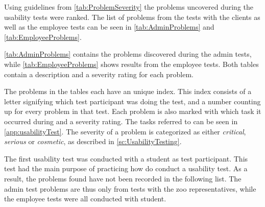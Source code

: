 Using guidelines from \autoref{tab:ProblemSeverity} the problems uncovered during the usability tests were ranked. The list of problems from the tests with the clients as well as the employee tests can be seen in \autoref{tab:AdminProblems} and \autoref{tab:EmployeeProblems}. 
\par
\autoref{tab:AdminProblems} contains the problems discovered during the admin tests, while \autoref{tab:EmployeeProblems} shows results from the employee tests. Both tables contain a description and a severity rating for each problem. 
\par
The problems in the tables each have an unique index. This index consists of a letter signifying which test participant was doing the test, and a number counting up for every problem in that test. Each problem is also marked with which task it occurred during and a severity rating. The tasks referred to can be seen in \autoref{app:usabilityTest}. The severity of a problem is categorized as either \textit{critical}, \textit{serious} or \textit{cosmetic}, as described in \autoref{sc:UsabilityTesting}. 
\par
The first usability test was conducted with a student as test participant. This test had the main purpose of practicing how do conduct a usability test. As a result, the problems found have not been recorded in the following list. The admin test problems are thus only from tests with the zoo representatives, while the employee tests were all conducted with student.

